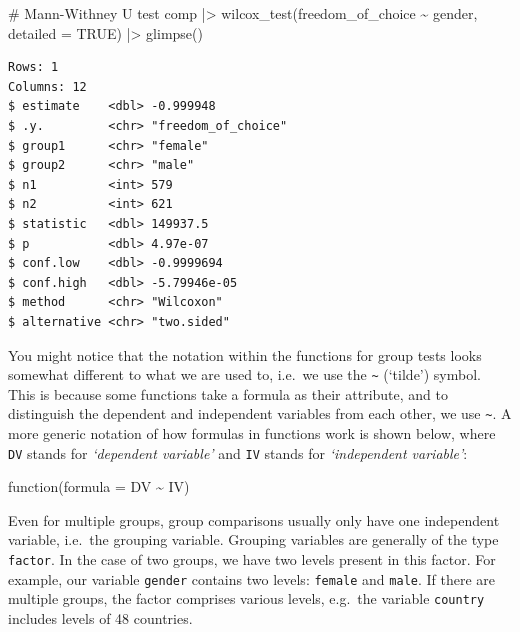 \documentclass[
  letterpaper,
]{krantz}
\makeatletter
\newenvironment{Shaded}{\begin{snugshade}}{\end{snugshade}}
\newcommand{\AttributeTok}[1]{\textcolor[rgb]{0.40,0.45,0.13}{#1}}
\newcommand{\CommentTok}[1]{\textcolor[rgb]{0.37,0.37,0.37}{#1}}
\newcommand{\ConstantTok}[1]{\textcolor[rgb]{0.56,0.35,0.01}{#1}}
\newcommand{\FunctionTok}[1]{\textcolor[rgb]{0.28,0.35,0.67}{#1}}
\newcommand{\NormalTok}[1]{\textcolor[rgb]{0.00,0.23,0.31}{#1}}
\newcommand{\SpecialCharTok}[1]{\textcolor[rgb]{0.37,0.37,0.37}{#1}}
\newenvironment{kframe}{%
\medskip{}
\setlength{\fboxsep}{.8em}
 \def\at@end@of@kframe{}%
 \ifinner\ifhmode%
  \def\at@end@of@kframe{\end{minipage}}%
  \begin{minipage}{\columnwidth}%
 \fi\fi%
 \def\FrameCommand##1{\hskip\@totalleftmargin \hskip-\fboxsep
 \colorbox{shadecolor}{##1}\hskip-\fboxsep
     \hskip-\linewidth \hskip-\@totalleftmargin \hskip\columnwidth}%
 \MakeFramed {\advance\hsize-\width
   \@totalleftmargin\z@ \linewidth\hsize
   \@setminipage}}%
 {\par\unskip\endMakeFramed%
 \at@end@of@kframe}
\renewenvironment{Shaded}{\begin{kframe}}{\end{kframe}}
\makeatother
\begin{document}
\begin{Shaded}
\begin{Highlighting}[]
\CommentTok{\# Mann{-}Withney U test}
\NormalTok{comp }\SpecialCharTok{|\textgreater{}}
  \FunctionTok{wilcox\_test}\NormalTok{(freedom\_of\_choice }\SpecialCharTok{\textasciitilde{}}\NormalTok{ gender,}
              \AttributeTok{detailed =} \ConstantTok{TRUE}\NormalTok{) }\SpecialCharTok{|\textgreater{}}
  \FunctionTok{glimpse}\NormalTok{()}
\end{Highlighting}
\end{Shaded}

\begin{verbatim}
Rows: 1
Columns: 12
$ estimate    <dbl> -0.999948
$ .y.         <chr> "freedom_of_choice"
$ group1      <chr> "female"
$ group2      <chr> "male"
$ n1          <int> 579
$ n2          <int> 621
$ statistic   <dbl> 149937.5
$ p           <dbl> 4.97e-07
$ conf.low    <dbl> -0.9999694
$ conf.high   <dbl> -5.79946e-05
$ method      <chr> "Wilcoxon"
$ alternative <chr> "two.sided"
\end{verbatim}

You might notice that the notation within the functions for group tests
looks somewhat different to what we are used to, i.e.~we use the
\texttt{\textasciitilde{}} (`tilde') symbol. This is because some
functions take a formula as their attribute, and to distinguish the
dependent and independent variables from each other, we use
\texttt{\textasciitilde{}}. A more generic notation of how formulas in
functions work is shown below, where \texttt{DV} stands for
\emph{`dependent variable'} and \texttt{IV} stands for
\emph{`independent variable'}:

\label{formulas-in-functions}
function(formula = DV \textasciitilde{} IV)

Even for multiple groups, group comparisons usually only have one
independent variable, i.e.~the grouping variable. Grouping variables are
generally of the type \texttt{factor}. In the case of two groups, we
have two levels present in this factor. For example, our variable
\texttt{gender} contains two levels: \texttt{female} and \texttt{male}.
If there are multiple groups, the factor comprises various levels,
e.g.~the variable \texttt{country} includes levels of 48 countries.
\end{document}
